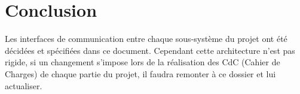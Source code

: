 \section{Conclusion}

Les interfaces de communication entre chaque sous-système du projet ont été 
décidées et spécifiées dans ce document. Cependant cette architecture n'est pas 
rigide, si un changement s’impose lors de la réalisation des CdC (Cahier de Charges) 
de chaque partie du projet, il faudra remonter à ce dossier et lui actualiser.
